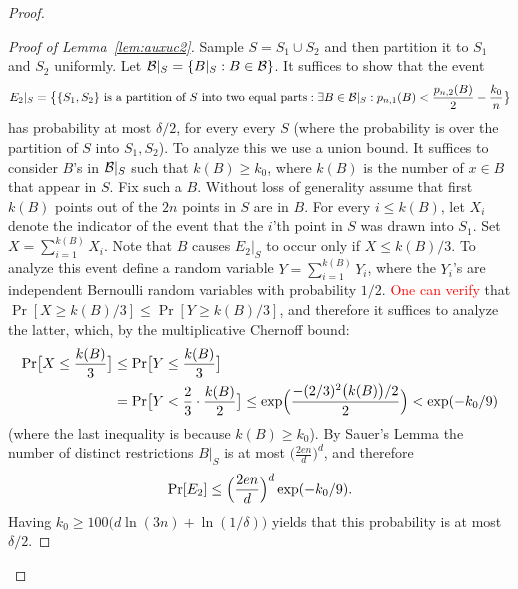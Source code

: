 \documentclass{article}
\newcommand{\B}{{\cal B}}
\newcommand{\samp}{S}
\newcommand{\new}[1]{\textcolor{red}{#1}}
\newcommand{\comment}[3]{\marginpar{\textcolor{#2}{#1: #3}}}
\newcommand{\shay}[1]{\comment{Shay}{red}{#1}}
\begin{document}
\begin{proof}
\begin{proof}[Proof of Lemma~\ref{lem:auxuc2}]
Sample $\samp=\samp_1\cup \samp_2$ and 
then partition it to $\samp_1$ and $\samp_2$ uniformly.
Let $\B|_{\samp} = \{B|_{\samp} : B\in\B\}$.
It suffices to show that the event
\[E_2|_{\samp} = 
\bigl\{ \{S_1,S_2\}\text{ is a partition of $S$ into two equal parts} :
\exists {B\in\B|_{\samp}}:
p_{n,1}(B) < \frac{p_{n,2}(B)}{2} - \frac{k_0}{n}
  \bigr\}
\]
has probability at most $\delta/2$, for every every $\samp$ 
(where the probability is over the partition of $\samp$ into $\samp_1,\samp_2$).
To analyze this we use a union bound. 
It suffices to consider $B$'s in $\B|_{\samp}$ such that $k(B) \geq k_0$,
where $k(B)$ is the number of $x\in B$ that appear in $S$.
Fix such a $B$.
Without loss of generality assume that
first $k(B)$ points out of the $2n$
points in $S$ are in $B$. 
For every $i\leq k(B)$,
let $X_i$ denote the indicator of the event
that the $i$'th point in $S$ was drawn into $S_1$.
Set~$X=\sum_{i=1}^{k(B)}X_i$.
Note that $B$ causes $E_2|_{\samp}$ to occur only if $X\leq k(B)/3$.
To analyze this event define a random variable $Y=\sum_{i=1}^{k(B)}Y_i$,
where the $Y_i$'s are independent Bernoulli random variables with probability $1/2$.
\new{One can verify} that $\Pr[X\geq k(B)/3]\leq \Pr[Y\geq k(B)/3]$,
and therefore it suffices to analyze the latter, 
which, by the multiplicative Chernoff bound:
\shay{Here we should refer to the statement that sampling without repetitions is more concentrated.}
\begin{align*}
\Pr\bigl[X\leq \frac{k(B)}{3}\bigr]&\leq 
\Pr\bigl[Y\leq \frac{k(B)}{3}\bigr]\\
&=\Pr\bigl[Y < \frac{2}{3}\cdot\frac{k(B)}{2}\bigr]\leq
\exp\Bigl(\frac{-(2/3)^2\bigl(k(B)\bigr)/2}{2}\Bigr) < \exp(-k_0/9)
\end{align*}
(where the last inequality is because $k(B) \geq k_0$).
By Sauer's Lemma
the number of distinct restrictions $B|_S$ is at most $\bigl(\frac{2en}{d}\bigr)^d$, and therefore 
\[\Pr[E_2]\leq \Bigl(\frac{2en}{d}\Bigr)^d\exp(-k_0/9).\]
Having $k_0\geq 100\bigl(d\ln(3n) + \ln(1/\delta)\bigr)$ yields
that this probability is at most $\delta/2$.
\end{proof}
\end{proof}



%
\end{document}
